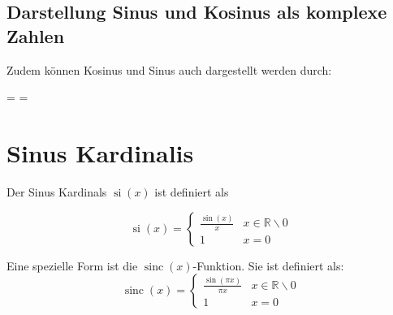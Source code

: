 \documentclass[12pt, a4paper]{scrreprt}
\begin{document}
\subsection{Darstellung Sinus und Kosinus als komplexe Zahlen}

Zudem können Kosinus und Sinus auch dargestellt werden durch:

\begin{mathframed}
  \cos \varphi =  \qquad
  \sin \varphi = 
\end{mathframed}

\section{Sinus Kardinalis}

\begin{minipage}{.5\linewidth}
Der Sinus Kardinals \(\operatorname{si}(x)\) ist definiert als

\[
  \operatorname{si}(x)=
  \begin{cases}
    \frac{\sin(x)}{x} & x \in \mathbb{R} \backslash 0\\
    1 & x = 0
  \end{cases}
\]
\end{minipage}%
\begin{minipage}{.5\linewidth}
  \begin{center}
  \end{center}
\end{minipage}

\begin{minipage}{.5\linewidth}
  Eine spezielle Form ist die \(\operatorname{sinc}(x)\)-Funktion. Sie ist definiert als:
  \[
    \operatorname{sinc}(x)=
    \begin{cases}
      \frac{\sin(\pi x)}{\pi x} & x \in\mathbb{R} \backslash 0\\
      1 & x = 0
    \end{cases}
  \]
\end{minipage}%
\begin{minipage}{.5\linewidth}
  \begin{center}
  \end{center}
\end{minipage}
\end{document}
